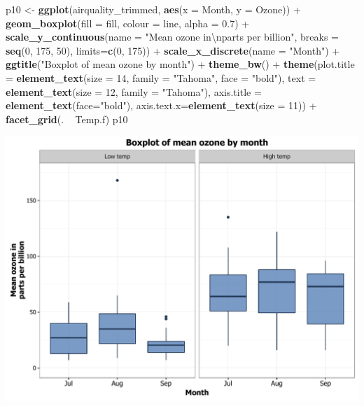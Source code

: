 \documentclass[]{article}
\newenvironment{Shaded}{\begin{snugshade}}{\end{snugshade}}
\newcommand{\KeywordTok}[1]{\textcolor[rgb]{0.13,0.29,0.53}{\textbf{{#1}}}}
\newcommand{\DataTypeTok}[1]{\textcolor[rgb]{0.13,0.29,0.53}{{#1}}}
\newcommand{\DecValTok}[1]{\textcolor[rgb]{0.00,0.00,0.81}{{#1}}}
\newcommand{\FloatTok}[1]{\textcolor[rgb]{0.00,0.00,0.81}{{#1}}}
\newcommand{\CharTok}[1]{\textcolor[rgb]{0.31,0.60,0.02}{{#1}}}
\newcommand{\StringTok}[1]{\textcolor[rgb]{0.31,0.60,0.02}{{#1}}}
\newcommand{\NormalTok}[1]{{#1}}
\begin{document}
\begin{Shaded}
\begin{Highlighting}[]
\NormalTok{p10 <-}\StringTok{ }\KeywordTok{ggplot}\NormalTok{(airquality_trimmed, }\KeywordTok{aes}\NormalTok{(}\DataTypeTok{x =} \NormalTok{Month, }\DataTypeTok{y =} \NormalTok{Ozone)) +}\StringTok{ }
\StringTok{        }\KeywordTok{geom_boxplot}\NormalTok{(}\DataTypeTok{fill =} \NormalTok{fill, }\DataTypeTok{colour =} \NormalTok{line,}
                     \DataTypeTok{alpha =} \FloatTok{0.7}\NormalTok{) +}
\StringTok{        }\KeywordTok{scale_y_continuous}\NormalTok{(}\DataTypeTok{name =} \StringTok{"Mean ozone in}\CharTok{\textbackslash{}n}\StringTok{parts per billion"}\NormalTok{,}
                           \DataTypeTok{breaks =} \KeywordTok{seq}\NormalTok{(}\DecValTok{0}\NormalTok{, }\DecValTok{175}\NormalTok{, }\DecValTok{50}\NormalTok{),}
                           \DataTypeTok{limits=}\KeywordTok{c}\NormalTok{(}\DecValTok{0}\NormalTok{, }\DecValTok{175}\NormalTok{)) +}
\StringTok{        }\KeywordTok{scale_x_discrete}\NormalTok{(}\DataTypeTok{name =} \StringTok{"Month"}\NormalTok{) +}
\StringTok{        }\KeywordTok{ggtitle}\NormalTok{(}\StringTok{"Boxplot of mean ozone by month"}\NormalTok{) +}
\StringTok{        }\KeywordTok{theme_bw}\NormalTok{() +}
\StringTok{        }\KeywordTok{theme}\NormalTok{(}\DataTypeTok{plot.title =} \KeywordTok{element_text}\NormalTok{(}\DataTypeTok{size =} \DecValTok{14}\NormalTok{, }\DataTypeTok{family =} \StringTok{"Tahoma"}\NormalTok{, }\DataTypeTok{face =} \StringTok{"bold"}\NormalTok{), }
              \DataTypeTok{text =} \KeywordTok{element_text}\NormalTok{(}\DataTypeTok{size =} \DecValTok{12}\NormalTok{, }\DataTypeTok{family =} \StringTok{"Tahoma"}\NormalTok{),}
              \DataTypeTok{axis.title =} \KeywordTok{element_text}\NormalTok{(}\DataTypeTok{face=}\StringTok{"bold"}\NormalTok{),}
              \DataTypeTok{axis.text.x=}\KeywordTok{element_text}\NormalTok{(}\DataTypeTok{size =} \DecValTok{11}\NormalTok{)) +}
\StringTok{        }\KeywordTok{facet_grid}\NormalTok{(. ~}\StringTok{ }\NormalTok{Temp.f)}
\NormalTok{p10}
\end{Highlighting}
\end{Shaded}

\begin{center}\includegraphics{0_all_posts_pdf/box_16-1} \end{center}
\end{document}
